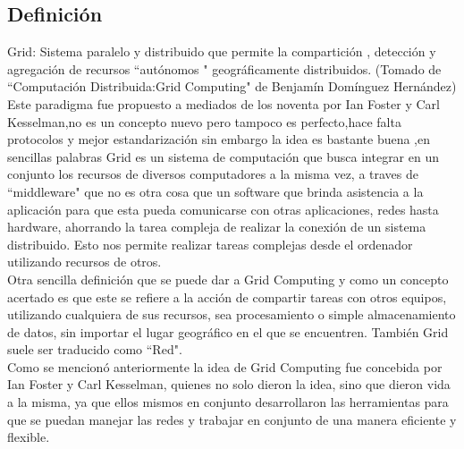 \documentclass[12pt]{article}
\begin{document}
{{\subsection{Definici\'on}
Grid: Sistema paralelo y distribuido que permite la compartici\'on , detecci\'on y agregaci\'on de recursos ``aut\'onomos " geogr\'aficamente distribuidos. (Tomado de ``Computaci\'on Distribuida:Grid Computing" de Benjam\'in Dom\'inguez Hern\'andez) 
\vspace{0.2in}
\\Este paradigma fue propuesto a mediados de los noventa por Ian Foster y Carl Kesselman,no es un concepto nuevo pero tampoco es perfecto,hace falta protocolos y mejor estandarizaci\'on sin embargo la idea es bastante buena ,en sencillas palabras Grid es un sistema de computaci\'on que busca integrar en un conjunto los recursos de diversos computadores a la misma vez, a traves de ``middleware" que no es otra cosa que un software que brinda asistencia a la aplicaci\'on para que esta pueda comunicarse con otras aplicaciones, redes hasta hardware, ahorrando la tarea compleja de realizar la conexi\'on de un sistema distribuido. Esto nos permite realizar tareas complejas desde el ordenador utilizando recursos de otros.\\
Otra sencilla definici\'on que se puede dar a Grid Computing y como un concepto acertado es que este se refiere a la acci\'on de compartir tareas con otros equipos, utilizando cualquiera de sus recursos, sea procesamiento o simple almacenamiento de datos, sin importar el lugar geogr\'afico en el que se encuentren. Tambi\'en Grid suele ser traducido como ``Red".\\
Como se mencion\'o anteriormente la idea de Grid Computing fue concebida por Ian Foster y Carl Kesselman, quienes no solo dieron la idea, sino que dieron vida a la misma, ya que ellos mismos en conjunto desarrollaron las herramientas para que se puedan manejar las redes y trabajar en conjunto de una manera eficiente y flexible.

}}
\end{document}
